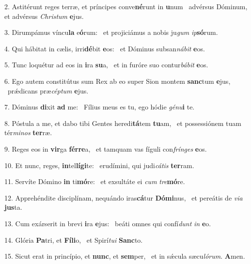 2. Astitérunt reges terræ, et príncipes conve\textbf{né}runt in \textbf{u}num \ast\  advérsus Dóminum, et advérsus \textit{Chris}\textit{tum} \textbf{e}jus.\

3. Dirumpámus víncu\textbf{la} e\textbf{ó}rum: \ast\  et projiciámus a nobis ju\textit{gum} \textit{ip}\textbf{só}rum.\

4. Qui hábitat in cælis, irri\textbf{dé}bit \textbf{e}os: \ast\  et Dóminus subsan\textit{ná}\textit{bit} \textbf{e}os.\

5. Tunc loquétur ad eos in \textbf{i}ra \textbf{su}a, \ast\  et in furóre suo contur\textit{bá}\textit{bit} \textbf{e}os.\

6. Ego autem constitútus sum Rex ab eo super Sion montem \textbf{sanc}tum \textbf{e}jus, \ast\  prǽdicans præ\textit{cép}\textit{tum} \textbf{e}jus.\

7. Dóminus \textbf{di}xit \textbf{ad} me: \ast\  Fílius meus es tu, ego hódie \textit{gé}\textit{nu}\textbf{i} te.\

8. Póstula a me, et dabo tibi Gentes heredi\textbf{tá}tem \textbf{tu}am, \ast\  et possessiónem tuam tér\textit{mi}\textit{nos} \textbf{ter}ræ.\

9. Reges eos in \textbf{vir}ga \textbf{fér}\textbf{re}a, \ast\  et tamquam vas fíguli con\textit{frín}\textit{ges} \textbf{e}os.\

10. Et nunc, reges, \textbf{in}tel\textbf{lí}\textbf{gi}te: \ast\  erudímini, qui judi\textit{cá}\textit{tis} \textbf{ter}ram.\

11. Servíte Dómino \textbf{in} ti\textbf{mó}re: \ast\  et exsultáte ei \textit{cum} \textit{tre}\textbf{mó}re.\

12. Apprehéndite disciplínam, nequándo iras\textbf{cá}tur \textbf{Dó}\textbf{mi}nus, \ast\  et pereátis de \textit{vi}\textit{a} \textbf{jus}ta.\

13. Cum exárserit in brevi \textbf{i}ra \textbf{e}jus: \ast\  beáti omnes qui confí\textit{dunt} \textit{in} \textbf{e}o.\

14. Glória \textbf{Pa}tri, et \textbf{Fí}\textbf{li}o, \ast\  et Spirí\textit{tu}\textit{i} \textbf{Sanc}to.\

15. Sicut erat in princípio, et \textbf{nunc}, et \textbf{sem}per, \ast\  et in sǽcula sæcu\textit{ló}\textit{rum}. \textbf{A}men.\

